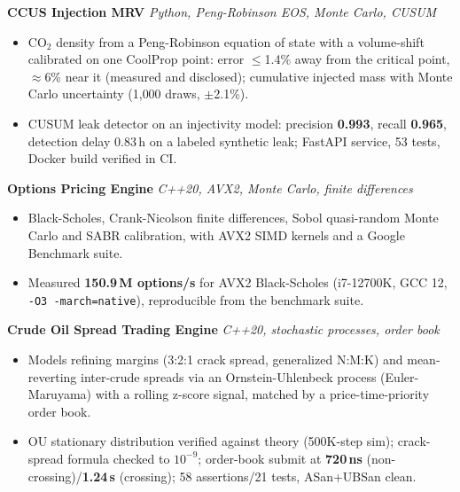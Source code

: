 \documentclass[10pt]{article}
\newcommand{\projectentry}[2]{%
  \noindent\textbf{#1} \hfill \textit{#2}\\[-0.3em]
}
\begin{document}
\projectentry{CCUS Injection MRV}{Python, Peng-Robinson EOS, Monte Carlo, CUSUM}
\begin{itemize}
  \item CO$_2$ density from a Peng-Robinson equation of state with a volume-shift calibrated on one CoolProp point: error $\leq$1.4\% away from the critical point, $\approx$6\% near it (measured and disclosed); cumulative injected mass with Monte Carlo uncertainty (1{,}000 draws, $\pm$2.1\%).
  \item CUSUM leak detector on an injectivity model: precision \textbf{0.993}, recall \textbf{0.965}, detection delay 0.83\,h on a labeled synthetic leak; FastAPI service, 53 tests, Docker build verified in CI.
\end{itemize}

\projectentry{Options Pricing Engine}{C++20, AVX2, Monte Carlo, finite differences}
\begin{itemize}
  \item Black-Scholes, Crank-Nicolson finite differences, Sobol quasi-random Monte Carlo and SABR calibration, with AVX2 SIMD kernels and a Google Benchmark suite.
  \item Measured \textbf{150.9\,M options/s} for AVX2 Black-Scholes (i7-12700K, GCC 12, \texttt{-O3 -march=native}), reproducible from the benchmark suite.
\end{itemize}

\projectentry{Crude Oil Spread Trading Engine}{C++20, stochastic processes, order book}
\begin{itemize}
  \item Models refining margins (3:2:1 crack spread, generalized N:M:K) and mean-reverting inter-crude spreads via an Ornstein-Uhlenbeck process (Euler-Maruyama) with a rolling z-score signal, matched by a price-time-priority order book.
  \item OU stationary distribution verified against theory (500K-step sim); crack-spread formula checked to $10^{-9}$; order-book submit at \textbf{720\,ns} (non-crossing)/\textbf{1.24\,\textmu s} (crossing); 58 assertions/21 tests, ASan+UBSan clean.
\end{itemize}
\end{document}
